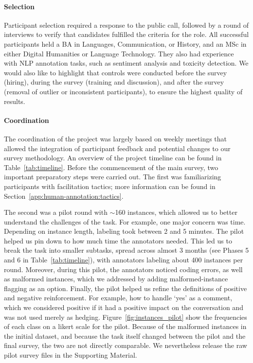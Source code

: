 \documentclass[11pt]{article}
\theoremstyle{definition}
\theoremstyle{plain}
\begin{document}
\paragraph{Selection} Participant selection required a response to the public call, followed by a round of interviews to verify that candidates fulfilled the criteria for the role. All successful participants held a BA in Languages, Communication, or History, and an MSc in either Digital Humanities or Language Technology. They also had experience with NLP annotation tasks, such as sentiment analysis and toxicity detection. We would also like to highlight that controls were conducted before the survey (hiring), during the survey (training and discussion), and after the survey (removal of outlier or inconsistent participants), to ensure the highest quality of results.

\paragraph{Coordination} The coordination of the project was largely based on weekly meetings that allowed the integration of participant feedback and potential changes to our survey methodology. An overview of the project timeline can be found in Table~\ref{tab:timeline}. Before the commencement of the main survey, two important preparatory steps were carried out. The first was familiarizing participants with facilitation tactics; more information can be found in Section~\ref{app:human-annotation:tactics}. 

The second was a pilot round with $\sim$160 instances, which allowed us to better understand the challenges of the task. For example, one major concern was time. Depending on instance length, labeling took between 2 and 5 minutes. The pilot helped us pin down to how much time the annotators needed. This led us to break the task into smaller subtasks, spread across almost 3 months (see Phases 5 and 6 in Table~\ref{tab:timeline}), with annotators labeling about 400 instances per round. Moreover, during this pilot, the annotators noticed coding errors, as well as malformed instances, which we addressed by adding malformed-instance flagging as an option. Finally, the pilot helped us refine the definitions of positive and negative reinforcement. For example, how to handle `yes' as a comment, which we considered positive if it had a positive impact on the conversation and was not used merely as hedging. Figure~\ref{fig:instances_pilot} show the frequencies of each class on a likert scale for the pilot. Because of the malformed instances in the initial dataset, and because the task itself changed between the pilot and the final survey, the two are not directly comparable. We nevertheless release the raw pilot survey files in the Supporting Material.
\end{document}
